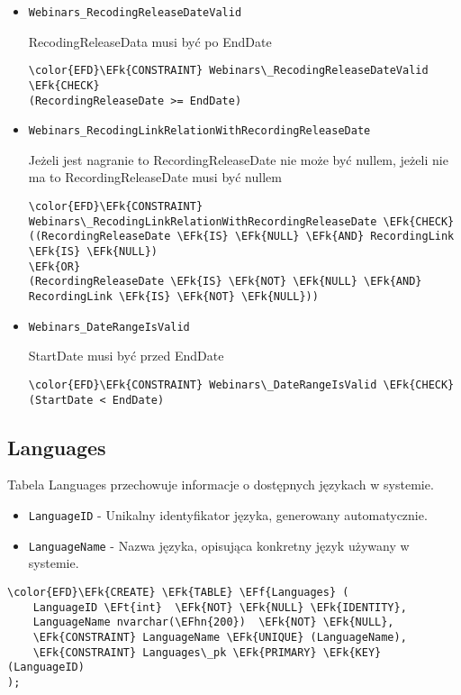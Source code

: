 \documentclass[11pt]{article}
\newcommand{\EFk}[1]{\textcolor{EFk}{\textbf{#1}}} %
\newcommand{\EFf}[1]{\textcolor{EFf}{#1}} %
\newcommand{\EFt}[1]{\textcolor{EFt}{\textbf{#1}}} %
\newcommand{\EFhn}[1]{\textcolor{EFhn}{#1}} %
\begin{document}
\begin{itemize}
\item \texttt{Webinars\_RecodingReleaseDateValid}

RecodingReleaseData musi być po EndDate
\begin{Code}
\begin{Verbatim}
\color{EFD}\EFk{CONSTRAINT} Webinars\_RecodingReleaseDateValid \EFk{CHECK}
(RecordingReleaseDate >= EndDate)
\end{Verbatim}
\end{Code}
\item \texttt{Webinars\_RecodingLinkRelationWithRecordingReleaseDate}

Jeżeli jest nagranie to RecordingReleaseDate nie może być nullem, jeżeli nie ma to RecordingReleaseDate musi być nullem
\begin{Code}
\begin{Verbatim}
\color{EFD}\EFk{CONSTRAINT} Webinars\_RecodingLinkRelationWithRecordingReleaseDate \EFk{CHECK}
((RecordingReleaseDate \EFk{IS} \EFk{NULL} \EFk{AND} RecordingLink \EFk{IS} \EFk{NULL})
\EFk{OR}
(RecordingReleaseDate \EFk{IS} \EFk{NOT} \EFk{NULL} \EFk{AND} RecordingLink \EFk{IS} \EFk{NOT} \EFk{NULL}))
\end{Verbatim}
\end{Code}
\item \texttt{Webinars\_DateRangeIsValid}

StartDate musi być przed EndDate
\begin{Code}
\begin{Verbatim}
\color{EFD}\EFk{CONSTRAINT} Webinars\_DateRangeIsValid \EFk{CHECK}
(StartDate < EndDate)
\end{Verbatim}
\end{Code}
\end{itemize}
\subsection{Languages}
\label{sec:org85a8377}
Tabela Languages przechowuje informacje o dostępnych językach w systemie.
\begin{itemize}
\item \texttt{LanguageID} - Unikalny identyfikator języka, generowany automatycznie.
\item \texttt{LanguageName} - Nazwa języka, opisująca konkretny język używany w systemie.
\end{itemize}
\begin{Code}
\begin{Verbatim}
\color{EFD}\EFk{CREATE} \EFk{TABLE} \EFf{Languages} (
    LanguageID \EFt{int}  \EFk{NOT} \EFk{NULL} \EFk{IDENTITY},
    LanguageName nvarchar(\EFhn{200})  \EFk{NOT} \EFk{NULL},
    \EFk{CONSTRAINT} LanguageName \EFk{UNIQUE} (LanguageName),
    \EFk{CONSTRAINT} Languages\_pk \EFk{PRIMARY} \EFk{KEY}  (LanguageID)
);
\end{Verbatim}
\end{Code}
\end{document}
